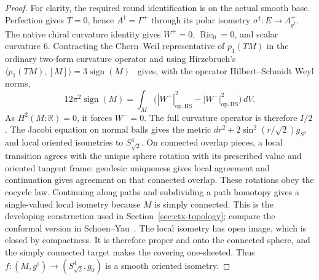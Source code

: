 \documentclass[11pt]{article}
\numberwithin{equation}{section}
\theoremstyle{definition}
\theoremstyle{remark}
\DeclareMathOperator{\Ric}{Ric}
\newcommand{\R}{\mathbb R}
\begin{document}
\begin{proof}
For clarity, the required round identification is on the
actual smooth base. Perfection gives $T=0$, hence
$A^\dagger=\Gamma^+$ through its polar isometry
$\sigma^\dagger:E\to\Lambda^+_{g^\dagger}$.
The native chiral curvature identity gives
$W^+=0$, $\Ric_0=0$, and scalar curvature $6$.
Contracting the Chern--Weil representative of $p_1(TM)$
in the ordinary two-form curvature operator and using
Hirzebruch's $\langle p_1(TM),[M]\rangle
=3\operatorname{sign}(M)$~\cite[\S4, p.~11, (16)]{Hirzebruch1971Signature}
gives, with the operator Hilbert--Schmidt Weyl norms,
\[
 12\pi^2\operatorname{sign}(M)
   =\int_M\bigl(|W^+|_{\mathrm{op,HS}}^2
                    -|W^-|_{\mathrm{op,HS}}^2\bigr)\,dV.
\]
As $H^2(M;\R)=0$, it forces $W^-=0$. The full curvature
operator is therefore $I/2$.
The Jacobi equation on normal balls gives the metric
$dr^2+2\sin^2(r/\sqrt2)g_{S^3}$ and local oriented
isometries to $S^4_{\sqrt2}$. On connected overlap pieces,
a local transition agrees with the unique sphere rotation
with its prescribed value and oriented tangent frame:
geodesic uniqueness gives local agreement and continuation
gives agreement on that connected overlap. These rotations
obey the cocycle law. Continuing along
paths and subdividing a path homotopy gives a single-valued
local isometry because $M$ is simply connected. This is
the developing construction used in
Section~\ref{sec:ctx-topology}; compare the conformal
version in Schoen--Yau~\cite[pp.~47, 49--50]{SchoenYau1988Conformal}.
The local isometry has open image, which is closed by
compactness. It is therefore proper and onto the connected
sphere, and the simply connected target makes the covering
one-sheeted. Thus
$f:(M,g^\dagger)\to(S^4_{\sqrt2},g_0)$ is a smooth oriented
isometry.


\end{proof}
\end{document}
